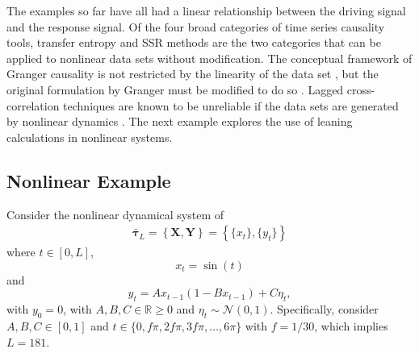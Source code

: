 \documentclass[a4paper,11pt,twocolumn]{article}
\begin{document}
The examples so far have all had a linear relationship between the driving signal and the response signal.  Of the four broad categories of time series causality tools, transfer entropy \cite{kaiser2002} and SSR methods \cite{Sugihara2012} are the two categories that can be applied to nonlinear data sets without modification.  The conceptual framework of Granger causality is not restricted by the linearity of the data set \cite{Granger1980}, but the original formulation by Granger must be modified to do so \cite{Sun2008}.  Lagged cross-correlation techniques are known to be unreliable if the data sets are generated by nonlinear dynamics \cite{Rogosa1980}.  The next example explores the use of leaning calculations in nonlinear systems.

\subsection{Nonlinear Example}
\label{sec:nonli}
Consider the nonlinear dynamical system of
\begin{eqnarray}
\label{eqn:nonlinearEX}
\bar{\mathbf{\tau}}_L = \left\{\mathbf{X},\mathbf{Y}\right\} = \left\{\{x_t\},\{y_t\}\right\}
\end{eqnarray}
where $t\in[0,L]$,
\begin{equation*}
x_t = \sin(t)
\end{equation*}
and
\begin{equation*}
y_t = Ax_{t-1}\left(1-Bx_{t-1}\right)+C\eta_t,
\end{equation*}
with $y_0 = 0$, with $A,B,C\in\mathbb{R}\ge 0$ and $\eta_t\sim\mathcal{N}\left(0,1\right)$.  Specifically, consider $A,B,C\in[0,1]$ and $t\in\{0,f\pi,2f\pi,3f\pi,\ldots,6\pi\}$ with $f=1/30$, which implies $L=181$.
\end{document}

